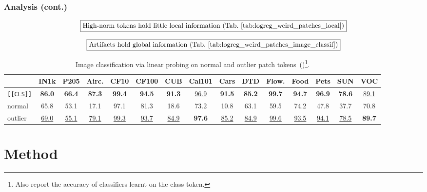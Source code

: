 \documentclass[aspectratio=169]{beamer}
\begin{document}
\begin{frame}
\frametitle{Analysis (cont.)}

$$
\boxed{\text{High-norm tokens hold little local information (Tab.~\ref{tab:logreg_weird_patches_local})}}
$$

$$
\boxed{\text{Artifacts hold global information (Tab.~\ref{tab:logreg_weird_patches_image_classif})}}
$$

\begin{table}[t]
    \centering
    \caption{%
        Image classification via linear probing on normal and outlier patch tokens~(\cite{darcetVisionTransformersNeed2024})\footnote{Also report the accuracy of classifiers learnt on the class token.}.
      }
    \vspace{-1em}
    \begin{tabular}{@{} l *{14}{c@{\hspace{4pt}}} @{}}
      \toprule
      & IN1k & P205 & Airc. & CF10 & CF100 & CUB & Cal101 & Cars & DTD & Flow. & Food & Pets & SUN & VOC \\
      \midrule
      \texttt{[\texttt{[CLS]}]} & \textbf{86.0} & \textbf{66.4} & \textbf{87.3} & \textbf{99.4} & \textbf{94.5} & \textbf{91.3} & \underline{96.9} & \textbf{91.5} & \textbf{85.2} & \textbf{99.7} & \textbf{94.7} & \textbf{96.9} & \textbf{78.6} & \underline{89.1} \\
      normal & 65.8 & 53.1 & 17.1 & 97.1 & 81.3 & 18.6 & 73.2 & 10.8 & 63.1 & 59.5 & 74.2 & 47.8 & 37.7 & 70.8 \\
      outlier & \underline{69.0} & \underline{55.1} & \underline{79.1} & \underline{99.3} & \underline{93.7} & \underline{84.9} & \textbf{97.6} & \underline{85.2} & \underline{84.9} & \underline{99.6} & \underline{93.5} & \underline{94.1} & \underline{78.5} & \textbf{89.7} \\
      \bottomrule
    \end{tabular}
    \vspace{-1em}
    \label{tab:logreg_weird_patches_image_classif}
\end{table}

\end{frame}



\section{Method}
\end{document}

